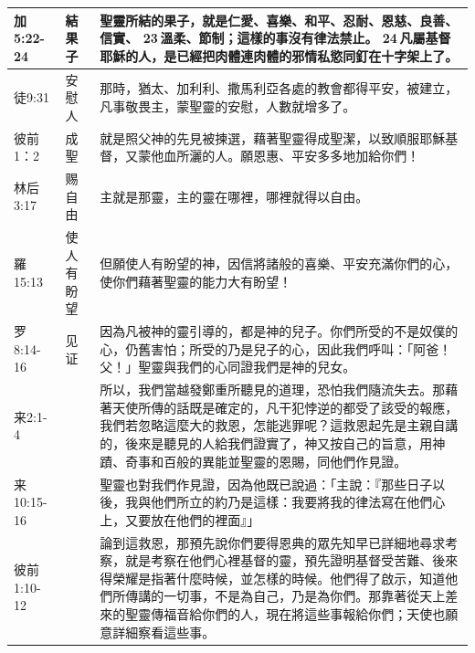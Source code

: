 \begin{table}[H]
\begin{tabular}{p{6em}|p{4em}|p{37em}}
加5:22-24&結果子&聖靈所結的果子，就是仁愛、喜樂、和平、忍耐、恩慈、良善、信實、 23 溫柔、節制；這樣的事沒有律法禁止。 24 凡屬基督耶穌的人，是已經把肉體連肉體的邪情私慾同釘在十字架上了。\\  \midrule

徒9:31&安慰人&那時，猶太、加利利、撒馬利亞各處的教會都得平安，被建立，凡事敬畏主，蒙聖靈的安慰，人數就增多了。\\  \midrule

彼前1：2&成聖&就是照父神的先見被揀選，藉著聖靈得成聖潔，以致順服耶穌基督，又蒙他血所灑的人。願恩惠、平安多多地加給你們！\\  \midrule


林后3:17&赐自由&主就是那靈，主的靈在哪裡，哪裡就得以自由。\\  \midrule

羅15:13&使人有盼望&但願使人有盼望的神，因信將諸般的喜樂、平安充滿你們的心，使你們藉著聖靈的能力大有盼望！\\ \bottomrule

罗8:14-16&见证&因為凡被神的靈引導的，都是神的兒子。你們所受的不是奴僕的心，仍舊害怕；所受的乃是兒子的心，因此我們呼叫：「阿爸！父！」聖靈與我們的心同證我們是神的兒女。\\  \midrule
来2:1-4&&所以，我們當越發鄭重所聽見的道理，恐怕我們隨流失去。那藉著天使所傳的話既是確定的，凡干犯悖逆的都受了該受的報應，我們若忽略這麼大的救恩，怎能逃罪呢？這救恩起先是主親自講的，後來是聽見的人給我們證實了，神又按自己的旨意，用神蹟、奇事和百般的異能並聖靈的恩賜，同他們作見證。\\  \midrule
来10:15-16&&聖靈也對我們作見證，因為他既已說過：「主說：『那些日子以後，我與他們所立的約乃是這樣：我要將我的律法寫在他們心上，又要放在他們的裡面』」\\  \midrule
彼前1:10-12&&論到這救恩，那預先說你們要得恩典的眾先知早已詳細地尋求考察，就是考察在他們心裡基督的靈，預先證明基督受苦難、後來得榮耀是指著什麼時候，並怎樣的時候。他們得了啟示，知道他們所傳講的一切事，不是為自己，乃是為你們。那靠著從天上差來的聖靈傳福音給你們的人，現在將這些事報給你們；天使也願意詳細察看這些事。 \\  \midrule
\end{tabular}%
\end{table}


